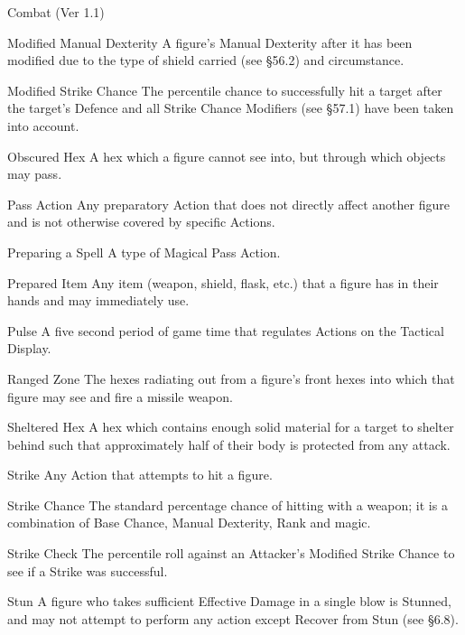 \begin{Chapter}{Combat (Ver 1.1)}
\begin{Description}
\item[Modified Manual Dexterity] A figure’s Manual Dexterity after it
  has been modified due to the type of shield carried (see §56.2) and
  circumstance.

\item[Modified Strike Chance] The percentile chance to successfully
  hit a target after the target’s Defence and all Strike Chance
  Modifiers (see §57.1) have been taken into account.

\item[Obscured Hex] A hex which a figure cannot see into, but through
  which objects may pass.

\item[Pass Action] Any preparatory Action that does not directly
  affect another figure and is not otherwise covered by specific
  Actions.

\item[Preparing a Spell] A type of Magical Pass Action.

\item[Prepared Item] Any item (weapon, shield, flask, etc.)  that a
  figure has in their hands and may immediately use.

\item[Pulse] A five second period of game time that regulates Actions
  on the Tactical Display.

\item[Ranged Zone] The hexes radiating out from a figure’s front hexes
  into which that figure may see and fire a missile weapon.

\item[Sheltered Hex] A hex which contains enough solid material for a
  target to shelter behind such that approximately half of their body
  is protected from any attack.

\item[Strike] Any Action that attempts to hit a figure.

\item[Strike Chance] The standard percentage chance of hitting with a
  weapon; it is a combination of Base Chance, Manual Dexterity, Rank
  and magic.

\item[Strike Check] The percentile roll against an Attacker’s Modified
  Strike Chance to see if a Strike was successful.

\item[Stun] A figure who takes sufficient Effective Damage in a single
  blow is Stunned, and may not attempt to perform any action except
  Recover from Stun (see §6.8).


\end{Description}
\end{Chapter}
